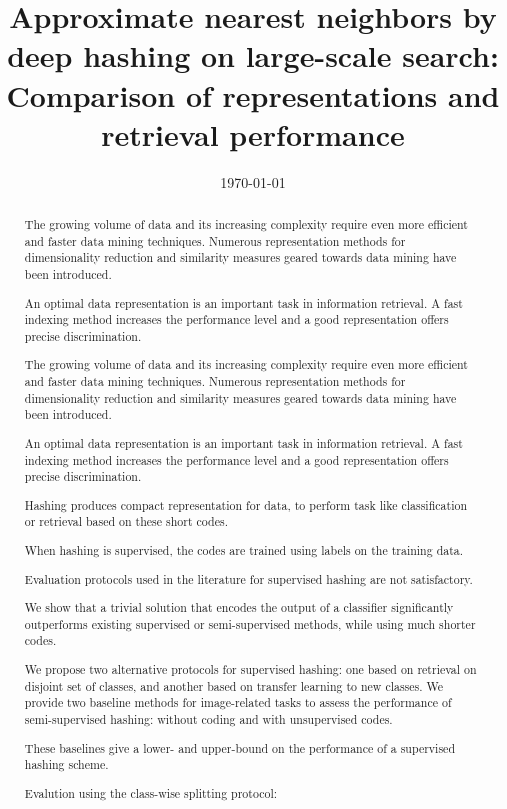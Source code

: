 \documentclass{article}
\title{Approximate nearest neighbors by  deep  hashing on large-scale search: Comparison of representations and retrieval performance}
\author {}
\date{\today}
\begin{document}
\tableofcontents
\maketitle

\begin{abstract} %
The growing volume of data and its increasing complexity require even more efficient and faster data mining techniques.  Numerous representation methods for dimensionality reduction and similarity measures geared towards  data mining have been introduced. 

An optimal data representation  is  an important  task in information retrieval.   A fast indexing method increases the performance level and a good representation offers precise discrimination.


The growing volume of data and its increasing complexity require even more efficient and faster data mining techniques.  Numerous representation methods for dimensionality reduction and similarity measures geared towards  data mining have been introduced.

An optimal data representation  is  an important  task in information retrieval.   A fast indexing method increases the performance level and a good representation offers precise discrimination.

Hashing produces  compact representation for  data, to perform task like classification or retrieval based on these short codes.

When hashing is supervised, the codes are trained using labels on the training data.

Evaluation protocols used in the literature for supervised hashing are not satisfactory.

We show that a trivial solution that encodes the output of a classifier significantly outperforms existing supervised or semi-supervised methods, while using much shorter codes.

We propose two alternative protocols for supervised hashing: one based on retrieval on disjoint set of classes, and another based on transfer learning to new classes. We provide two baseline methods for image-related tasks to assess the performance of semi-supervised hashing: without coding and with unsupervised codes.

These baselines give a lower- and upper-bound on the performance of a supervised hashing scheme.

Evalution using the class-wise splitting protocol:


\end{abstract}
\end{document}
